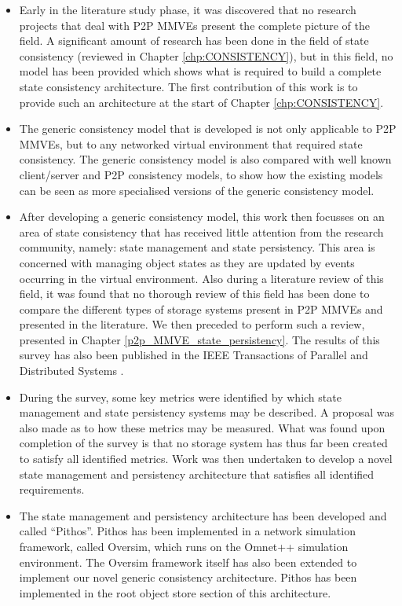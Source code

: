 \begin{itemize}
\item Early in the literature study phase, it was discovered that no research projects that deal with P2P MMVEs present the complete picture of the field. A significant amount of research has been done in the field of state consistency (reviewed in Chapter \ref{chp:CONSISTENCY}), but in this field, no model has been provided which shows what is required to build a complete state consistency architecture. The first contribution of this work is to provide such an architecture at the start of Chapter \ref{chp:CONSISTENCY}.

\item The generic consistency model that is developed is not only applicable to P2P MMVEs, but to any networked virtual environment that required state consistency. The generic consistency model is also compared with well known client/server and P2P consistency models, to show how the existing models can be seen as more specialised versions of the generic consistency model.

\item After developing a generic consistency model, this work then focusses on an area of state consistency that has received little attention from the research community, namely: state management and state persistency. This area is concerned with managing object states as they are updated by events occurring in the virtual environment. Also during a literature review of this field, it was found that no thorough review of this field has been done to compare the different types of storage systems present in P2P MMVEs and presented in the literature. We then preceded to perform such a review, presented in Chapter \ref{p2p_MMVE_state_persistency}. The results of this survey has also been published in the IEEE Transactions of Parallel and Distributed Systems \cite{gilmore_p2p_mmog_state_persistency}.

\item During the survey, some key metrics were identified by which state management and state persistency systems may be described. A proposal was also made as to how these metrics may be measured. What was found upon completion of the survey is that no storage system has thus far been created to satisfy all identified metrics. Work was then undertaken to develop a novel state management and persistency architecture that satisfies all identified requirements.

\item The state management and persistency architecture has been developed and called ``Pithos''. Pithos has been implemented in a network simulation framework, called Oversim, which runs on the Omnet++ simulation environment. The Oversim framework itself has also been extended to implement our novel generic consistency architecture. Pithos has been implemented in the root object store section of this architecture.


\end{itemize}
